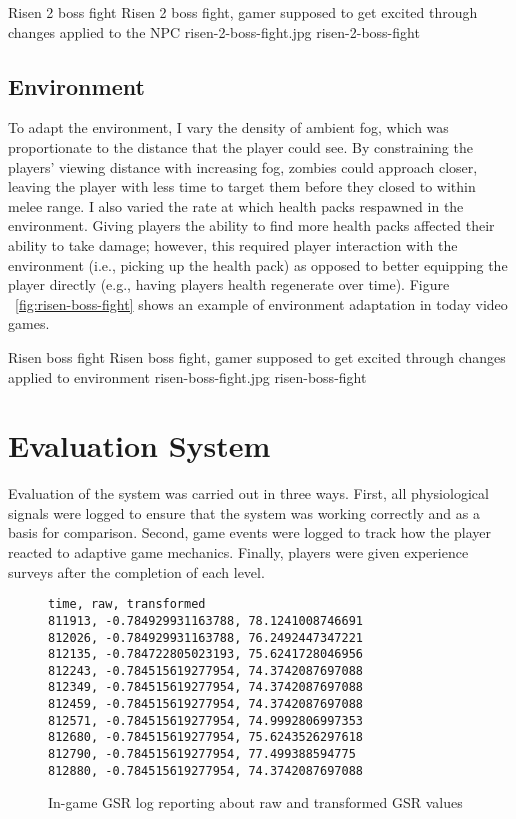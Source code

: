 \largeimg
{Risen 2 boss fight}
{Risen 2 boss fight, gamer supposed to get excited through changes applied to the NPC}
{risen-2-boss-fight.jpg}
{risen-2-boss-fight}

\subsection{Environment}
To adapt the environment, I vary the density of ambient fog, which was proportionate to the distance that the player could see. By constraining the players' viewing distance with increasing fog, zombies could approach closer, leaving the player with less time to target them before they closed to within melee range. I also varied the rate at which health packs respawned in the environment. Giving players the ability to find more health packs affected their ability to take damage; however, this required player interaction with the environment (i.e., picking up the health pack) as opposed to better equipping the player directly (e.g., having players health regenerate over time). Figure ~\ref{fig:risen-boss-fight} shows an example of environment adaptation in today video games.

\largeimg
{Risen boss fight}
{Risen boss fight, gamer supposed to get excited through changes applied to environment}
{risen-boss-fight.jpg}
{risen-boss-fight}

\section{Evaluation System}
Evaluation of the system was carried out in three ways. First, all physiological signals were logged to ensure that the system was working correctly and as a basis for comparison. Second, game events were logged to track how the player reacted to adaptive game mechanics. Finally, players were given experience surveys after the completion of each level.

\begin{figure}
  \centering
\begin{lstlisting}[frame=none]
time, raw, transformed
811913, -0.784929931163788, 78.1241008746691
812026, -0.784929931163788, 76.2492447347221
812135, -0.784722805023193, 75.6241728046956
812243, -0.784515619277954, 74.3742087697088
812349, -0.784515619277954, 74.3742087697088
812459, -0.784515619277954, 74.3742087697088
812571, -0.784515619277954, 74.9992806997353
812680, -0.784515619277954, 75.6243526297618
812790, -0.784515619277954, 77.499388594775
812880, -0.784515619277954, 74.3742087697088
\end{lstlisting}
  \caption{In-game GSR log reporting about raw and transformed GSR values}
  \label{txt:log-gsr}
\end{figure}

